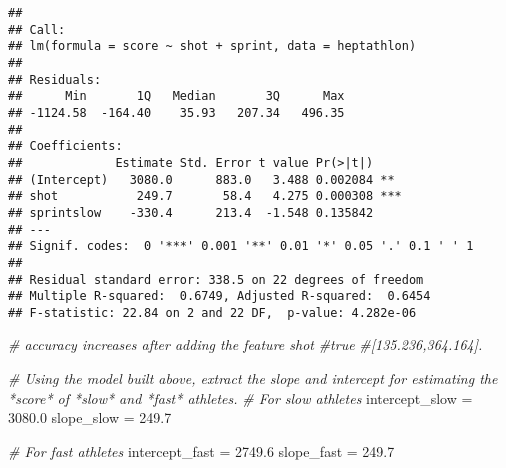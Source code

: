 \documentclass[
]{article}
\newenvironment{Shaded}{\begin{snugshade}}{\end{snugshade}}
\newcommand{\CommentTok}[1]{\textcolor[rgb]{0.56,0.35,0.01}{\textit{#1}}}
\newcommand{\FloatTok}[1]{\textcolor[rgb]{0.00,0.00,0.81}{#1}}
\newcommand{\NormalTok}[1]{#1}
\newcommand{\OtherTok}[1]{\textcolor[rgb]{0.56,0.35,0.01}{#1}}
\begin{document}
\begin{verbatim}
## 
## Call:
## lm(formula = score ~ shot + sprint, data = heptathlon)
## 
## Residuals:
##      Min       1Q   Median       3Q      Max 
## -1124.58  -164.40    35.93   207.34   496.35 
## 
## Coefficients:
##             Estimate Std. Error t value Pr(>|t|)    
## (Intercept)   3080.0      883.0   3.488 0.002084 ** 
## shot           249.7       58.4   4.275 0.000308 ***
## sprintslow    -330.4      213.4  -1.548 0.135842    
## ---
## Signif. codes:  0 '***' 0.001 '**' 0.01 '*' 0.05 '.' 0.1 ' ' 1
## 
## Residual standard error: 338.5 on 22 degrees of freedom
## Multiple R-squared:  0.6749, Adjusted R-squared:  0.6454 
## F-statistic: 22.84 on 2 and 22 DF,  p-value: 4.282e-06
\end{verbatim}

\begin{Shaded}
\begin{Highlighting}[]
\CommentTok{\# accuracy increases after adding the feature shot}
\CommentTok{\#true}
\CommentTok{\#[135.236,364.164].}
\end{Highlighting}
\end{Shaded}

\begin{Shaded}
\begin{Highlighting}[]
\CommentTok{\#  Using the model built above, extract the slope and intercept for estimating the *score* of *slow* and *fast* athletes. }
\CommentTok{\# For slow athletes}
\NormalTok{intercept\_slow }\OtherTok{=} \FloatTok{3080.0}
\NormalTok{slope\_slow }\OtherTok{=} \FloatTok{249.7}

\CommentTok{\# For fast athletes}
\NormalTok{intercept\_fast }\OtherTok{=} \FloatTok{2749.6}
\NormalTok{slope\_fast }\OtherTok{=} \FloatTok{249.7}
\end{Highlighting}
\end{Shaded}
\end{document}

